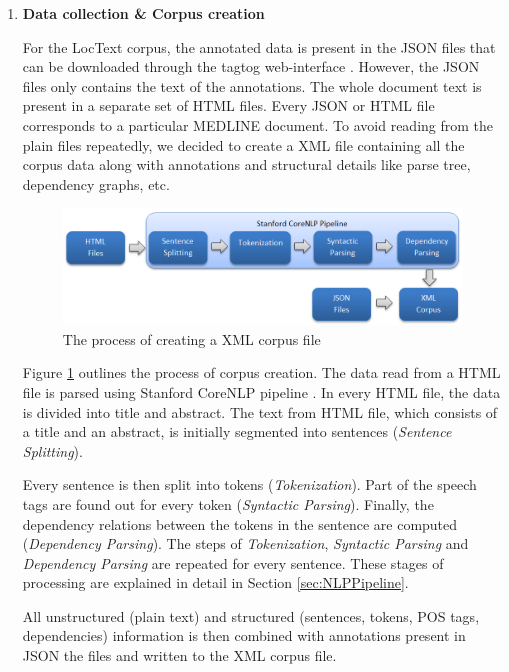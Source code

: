 \begin{enumerate}

\item \textbf{Data collection \& Corpus creation}

For the LocText corpus, the annotated data is present in the JSON files that can be downloaded through the tagtog web-interface \cite{cejuela2014tagtog}. However, the JSON files only contains the text of the annotations. The whole document text is present in a separate set of HTML files. Every JSON or HTML file corresponds to a particular MEDLINE \cite{medline} document. To avoid reading from the plain files repeatedly, we decided to create a XML file containing all the corpus data along with annotations and structural details like parse tree, dependency graphs, etc.

\begin{figure}
\centering
\includegraphics[scale=0.58]{figures/Corpus_Creation.png}
\caption{The process of creating a XML corpus file}\label{fig:corpusCreation}
\end{figure}

Figure \ref{fig:corpusCreation} outlines the process  of corpus creation. The data read from a HTML file is parsed using Stanford CoreNLP pipeline \cite{manning2014stanford}. In every HTML file, the data is divided into title and abstract. The text from HTML file, which consists of a title and an abstract, is initially segmented into sentences (\textit{Sentence Splitting}).

Every sentence is then split into tokens (\textit{Tokenization}). Part of the speech tags are found out for every token (\textit{Syntactic Parsing}). Finally, the dependency relations between the tokens in the sentence are computed (\textit{Dependency Parsing}). The steps of \textit{Tokenization}, \textit{Syntactic Parsing} and \textit{Dependency Parsing} are repeated for every sentence. These stages of processing are explained in detail in Section \ref{sec:NLPPipeline}.

All unstructured (plain text) and structured (sentences, tokens, POS tags, dependencies) information is then combined with annotations present in JSON the files and written to the XML corpus file.


\end{enumerate}
